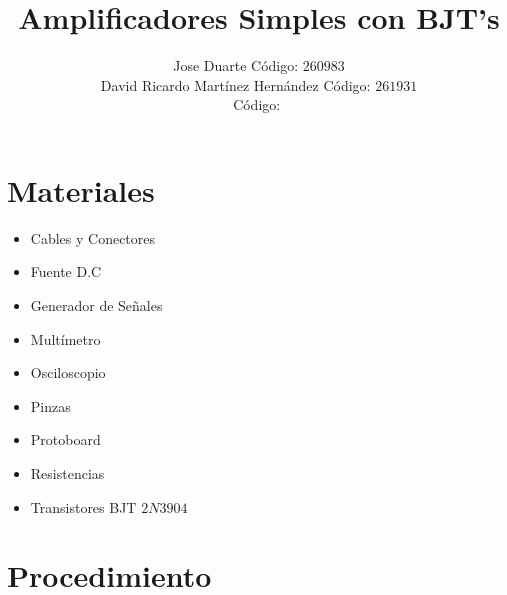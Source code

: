 \documentclass[10pt,graphicx,caption,rotating]{article}
\begin{document}
\title{\Huge {Amplificadores Simples con BJT's}}
\author{Jose Duarte Código: $260983$\\
	David Ricardo Martínez Hernández Código: $261931$\\
	 Código: $ $}
\date{}
\maketitle
{}

\section{Materiales}
\begin{itemize}
 \item Cables y Conectores
 \item Fuente D.C
 \item Generador de Señales
 \item Multímetro
 \item Osciloscopio
 \item Pinzas
 \item Protoboard
 \item Resistencias
 \item Transistores BJT $2N3904$
\end{itemize}

\section{Procedimiento}
\noindent
\end{document}
